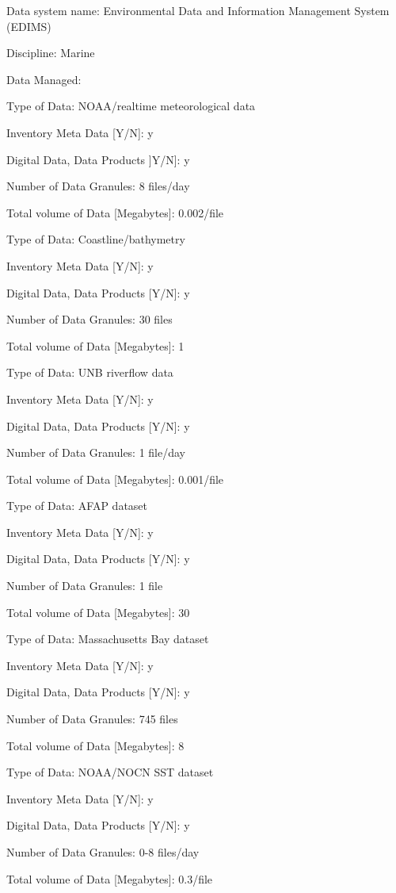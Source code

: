 \begin{description}

\item{Data system name:}  Environmental Data and Information 
Management System (EDIMS)
\item{Discipline:}  Marine
\item{Data Managed:}
	\begin{description}
	\item{Type of Data:}	NOAA/realtime meteorological data
	\item{Inventory Meta Data [Y/N]:}  y
	\item{Digital Data, Data Products ]Y/N]:}  y
	\item{Number of Data Granules:}  8 files/day
	\item{Total volume of Data [Megabytes]:}  0.002/file
\medskip
	\item{Type of Data:}  Coastline/bathymetry
	\item{Inventory Meta Data [Y/N]:}  y
	\item{Digital Data, Data Products [Y/N]:}  y
	\item{Number of Data Granules:}  30 files
	\item{Total volume of Data [Megabytes]:}  1
\medskip
	\item{Type of Data:}  UNB riverflow data
	\item{Inventory Meta Data [Y/N]:}  y
	\item{Digital Data, Data Products [Y/N]:}  y
	\item{Number of Data Granules:}  1 file/day
	\item{Total volume of Data [Megabytes]:}  0.001/file
\medskip
	\item{Type of Data:}  AFAP dataset
	\item{Inventory Meta Data [Y/N]:}  y
	\item{Digital Data, Data Products [Y/N]:}  y
	\item{Number of Data Granules:}  1 file
	\item{Total volume of Data [Megabytes]:}  30
\medskip
	\item{Type of Data:}  Massachusetts Bay dataset
	\item{Inventory Meta Data [Y/N]:}  y
	\item{Digital Data, Data Products [Y/N]:}  y
	\item{Number of Data Granules:}  745 files
	\item{Total volume of Data [Megabytes]:}  8
\medskip
	\item{Type of Data:}  NOAA/NOCN SST dataset
	\item{Inventory Meta Data [Y/N]:}  y
	\item{Digital Data, Data Products [Y/N]:}  y
	\item{Number of Data Granules:}  0-8 files/day
	\item{Total volume of Data [Megabytes]:}  0.3/file
	\end{description}
\end{description}

